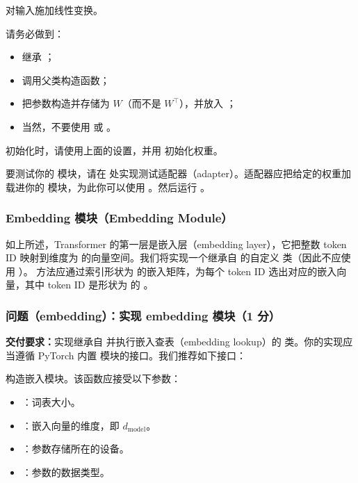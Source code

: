 \quad 对输入施加线性变换。

请务必做到：
\begin{itemize}
  \item 继承 ；
  \item 调用父类构造函数；
  \item 把参数构造并存储为 $W$（而不是 $W^{\top}$），并放入 ；
  \item 当然，不要使用  或 。
\end{itemize}

初始化时，请使用上面的设置，并用  初始化权重。

要测试你的  模块，请在  处实现测试适配器（adapter）。适配器应把给定的权重加载进你的  模块，为此你可以使用 。然后运行 。

\subsubsection{Embedding 模块（Embedding Module）}

如上所述，Transformer 的第一层是嵌入层（embedding layer），它把整数 token ID 映射到维度为  的向量空间。我们将实现一个继承自  的自定义  类（因此不应使用 ）。 方法应通过索引形状为  的嵌入矩阵，为每个 token ID 选出对应的嵌入向量，其中 token ID 是形状为  的 。

\subsubsection*{问题（embedding）：实现 embedding 模块（1 分）}

\textbf{交付要求：}实现继承自  并执行嵌入查表（embedding lookup）的  类。你的实现应当遵循 PyTorch 内置  模块的接口。我们推荐如下接口：

\quad 构造嵌入模块。该函数应接受以下参数：
\begin{itemize}
  \item {}：词表大小。
  \item {}：嵌入向量的维度，即 $d_{\mathrm{model}}$。
  \item {}：参数存储所在的设备。
  \item {}：参数的数据类型。
\end{itemize}

